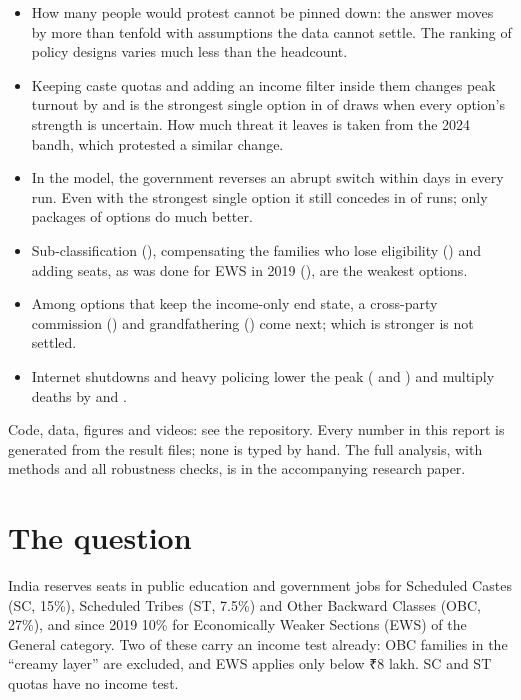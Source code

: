 \documentclass[11pt,a4paper]{article}
\newcommand{\rupee}{{\rupeefont ₹}}
\begin{document}
\begin{titlepage}
\begin{keyresult}[At a glance]
\begin{itemize}[leftmargin=12pt]
\item How many people would protest cannot be pinned down: the answer moves by more than tenfold with assumptions the data cannot settle. The ranking of policy designs varies much less than the headcount.
\item Keeping caste quotas and adding an income filter inside them changes peak turnout by \PeakChangeGroundedHybridCasteSubquotas{} and is the strongest single option in \MapGroundedStrongestLThree{} of draws when every option's strength is uncertain. How much threat it leaves is taken from the 2024 bandh, which protested a similar change.
\item In the model, the government reverses an abrupt switch within days in every run. Even with the strongest single option it still concedes in \ConcessionReferenceShareLThree{} of runs; only packages of options do much better.
\item Sub-classification (\PeakChangeGroundedSubClassification), compensating the families who lose eligibility (\PeakChangeGroundedCompensation) and adding seats, as was done for EWS in 2019 (\PeakChangeGroundedSeatExpansion), are the weakest options.
\item Among options that keep the income-only end state, a cross-party commission (\PeakChangeGroundedConsensusCommission) and grandfathering (\PeakChangeGroundedGrandfathering) come next; which is stronger is not settled.
\item Internet shutdowns and heavy policing lower the peak (\PeakChangeGroundedInternetShutdown{} and \PeakChangeGroundedHeavyPolicing) and multiply deaths by \DeathRatioGroundedInternetShutdown{} and \DeathRatioGroundedHeavyPolicing.
\end{itemize}
\end{keyresult}
\vfill
{\footnotesize\color{muted} Code, data, figures and videos: see the repository. Every number in this report is generated from the result files; none is typed by hand. The full analysis, with methods and all robustness checks, is in the accompanying research paper.\par}
\end{titlepage}

\tableofcontents
\newpage

\section{The question}

India reserves seats in public education and government jobs for Scheduled Castes (SC, 15\%), Scheduled Tribes (ST, 7.5\%) and Other Backward Classes (OBC, 27\%), and since 2019 10\% for Economically Weaker Sections (EWS) of the General category. Two of these carry an income test already: OBC families in the ``creamy layer'' are excluded, and EWS applies only below \rupee8 lakh. SC and ST quotas have no income test.
\end{document}
